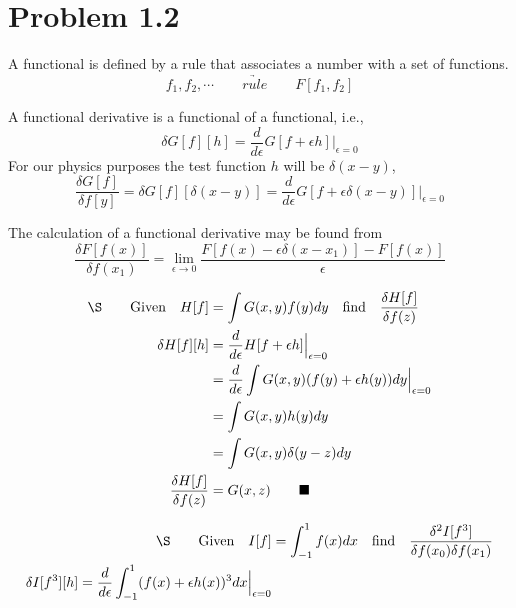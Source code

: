 \documentclass{amsart}
\begin{document}
\section*{Problem 1.2}

A functional is defined by a rule that associates a number with a set of functions.
\[f_1, f_2, \cdots\qquad\underrightarrow{rule}\qquad F[f_1, f_2] \]

A functional derivative is a functional of a functional, i.e.,
\[\delta G[f][h]=\frac{d}{d\epsilon}G[f+\epsilon h]\Big\vert_{\epsilon=0}\]
For our physics purposes the test function $h$ will be $\delta(x-y)$,
\[\frac{\delta G[f]}{\delta f[y]}=\delta G[f][\delta(x-y)]=\frac{d}{d\epsilon}G[f+\epsilon\delta(x-y)]\Big\vert_{\epsilon=0}\]

The calculation of a functional derivative may be found from
\[\frac{\delta F[f(x)]}{\delta f(x_1)}=\lim_{\epsilon\to 0}\frac{F[f(x)-\epsilon\delta(x-x_1)]-F[f(x)]}{\epsilon}    \]


\begin{align*}
    \qq*{\S}\qq{Given}H[f]          & =\int G(x,y)f(y)dy\qq{find}\frac{\delta H[f]}{\delta f(z)}                  \\
    \delta H[f][h]                  & =\frac{d}{d\epsilon}H[f+\epsilon h]\Big\vert_{\epsilon=0}                   \\
                                    & =\frac{d}{d\epsilon}\int G(x,y)(f(y)+\epsilon h(y))dy\Big\vert_{\epsilon=0} \\
                                    & =\int G(x,y)h(y)dy                                                          \\
                                    & =\int G(x,y)\delta(y-z)dy                                                   \\
    \frac{\delta H[f]}{\delta f(z)} & =G(x,z) \qquad \blacksquare
\end{align*}


\begin{align*}
    \qq*{\S}\qq{Given}I[f] & =\int_{-1}^{1} f(x)dx\qq{find}\frac{\delta^2 I[f^3]}{\delta f(x_0)\delta f(x_1)} \\
    \delta I[f^3][h]=\frac{d}{d\epsilon}\int_{-1}^{1} (f(x)+\epsilon h(x))^3 dx\Big\vert_{\epsilon=0}\\
    
\end{align*}
\end{document}
